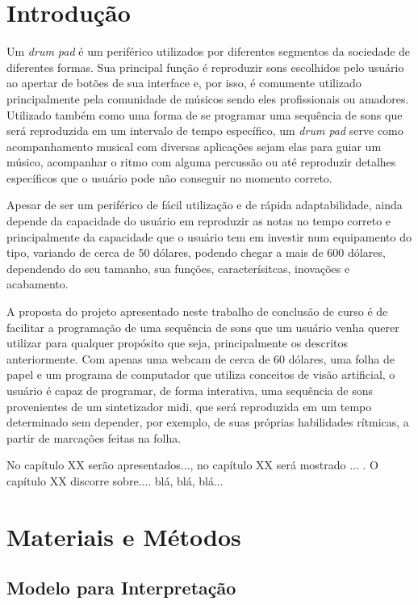 \documentclass[12pt]{report}
\begin{document}

\chapter{Introdução}
\label{cha:introducao}

Um {\it drum pad} é um periférico utilizados por diferentes segmentos da sociedade de diferentes formas. Sua principal função é reproduzir sons escolhidos pelo usuário ao apertar de botões de sua interface e, por isso, é comumente utilizado principalmente pela comunidade de músicos sendo eles profissionais ou amadores.
Utilizado também como uma forma de se programar uma sequência de sons que será reproduzida em um intervalo de tempo específico, um {\it drum pad} serve como acompanhamento musical com diversas aplicações sejam elas para guiar um músico, acompanhar o ritmo com alguma percussão ou até reproduzir detalhes específicos que o usuário pode não conseguir no momento correto.

Apesar de ser um periférico de fácil utilização e de rápida adaptabilidade, ainda depende da capacidade do usuário em reproduzir as notas no tempo correto e principalmente da capacidade que o usuário tem em investir num equipamento do tipo, variando de cerca de 50 dólares, podendo chegar a mais de 600 dólares, dependendo do seu tamanho, sua funções, caracterísitcas, inovações e acabamento.

A proposta do projeto apresentado neste trabalho de conclusão de curso é de facilitar a programação de uma sequência de sons que um usuário venha querer utilizar para qualquer propósito que seja, principalmente os descritos anteriormente. Com apenas uma webcam de cerca de 60 dólares, uma folha de papel e um programa de computador que utiliza conceitos de visão artificial, o usuário é capaz de programar, de forma interativa, uma sequência de sons provenientes de um sintetizador midi, que será reproduzida em um tempo determinado sem depender, por exemplo, de suas próprias habilidades rítmicas, a partir de marcações feitas na folha.

No capítulo XX serão apresentados..., no capítulo XX será mostrado
... . O capítulo XX discorre sobre.... blá, blá, blá...

\chapter{Materiais e Métodos}
\label{cha:fund-teor}

\section{Modelo para Interpretação}
\end{document}
